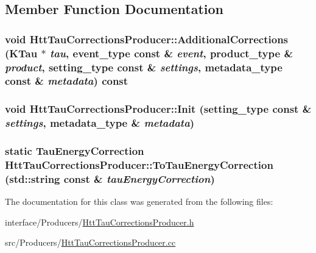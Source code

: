 \subsection{Member Function Documentation}
\hypertarget{classHttTauCorrectionsProducer_a8b1827912c40c7a6b0f4853b53419df2}{
\subsubsection[{AdditionalCorrections}]{\setlength{\rightskip}{0pt plus 5cm}void HttTauCorrectionsProducer::AdditionalCorrections (KTau $\ast$ {\em tau}, \/  {\bf event\_\-type} const \& {\em event}, \/  {\bf product\_\-type} \& {\em product}, \/  {\bf setting\_\-type} const \& {\em settings}, \/  {\bf metadata\_\-type} const \& {\em metadata}) const}}
\label{classHttTauCorrectionsProducer_a8b1827912c40c7a6b0f4853b53419df2}
\hypertarget{classHttTauCorrectionsProducer_ad331a4f917c0e86447c5ee80871a082d}{
\subsubsection[{Init}]{\setlength{\rightskip}{0pt plus 5cm}void HttTauCorrectionsProducer::Init ({\bf setting\_\-type} const \& {\em settings}, \/  {\bf metadata\_\-type} \& {\em metadata})}}
\label{classHttTauCorrectionsProducer_ad331a4f917c0e86447c5ee80871a082d}
\hypertarget{classHttTauCorrectionsProducer_aa38eb3feab13858436018db4360f7be4}{
\subsubsection[{ToTauEnergyCorrection}]{\setlength{\rightskip}{0pt plus 5cm}static {\bf TauEnergyCorrection} HttTauCorrectionsProducer::ToTauEnergyCorrection (std::string const \& {\em tauEnergyCorrection})}}
\label{classHttTauCorrectionsProducer_aa38eb3feab13858436018db4360f7be4}


The documentation for this class was generated from the following files:\begin{DoxyCompactItemize}
\item 
interface/Producers/\hyperlink{HttTauCorrectionsProducer_8h}{HttTauCorrectionsProducer.h}\item 
src/Producers/\hyperlink{HttTauCorrectionsProducer_8cc}{HttTauCorrectionsProducer.cc}\end{DoxyCompactItemize}
